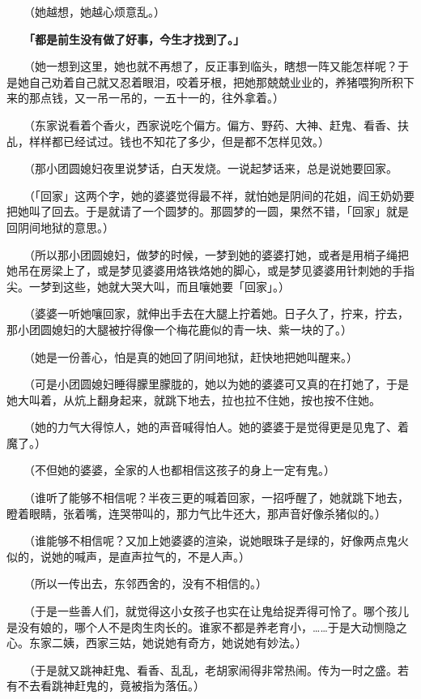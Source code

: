 \documentclass[UTF8]{ctexart}
\begin{document}
　　（她越想，她越心烦意乱。）

　　\textbf{「都是前生没有做了好事，今生才找到了。」}

　　（她一想到这里，她也就不再想了，反正事到临头，瞎想一阵又能怎样呢？于是她自己劝着自己就又忍着眼泪，咬着牙根，把她那兢兢业业的，养猪喂狗所积下来的那点钱，又一吊一吊的，一五十一的，往外拿着。）

　　（东家说看着个香火，西家说吃个偏方。偏方、野药、大神、赶鬼、看香、扶乩，样样都已经试过。钱也不知花了多少，但是都不怎样见效。）

　　（那小团圆媳妇夜里说梦话，白天发烧。一说起梦话来，总是说她要回家。

　　（「回家」这两个字，她的婆婆觉得最不祥，就怕她是阴间的花姐，阎王奶奶要把她叫了回去。于是就请了一个圆梦的。那圆梦的一圆，果然不错，「回家」就是回阴间地狱的意思。）

　　（所以那小团圆媳妇，做梦的时候，一梦到她的婆婆打她，或者是用梢子绳把她吊在房梁上了，或是梦见婆婆用烙铁烙她的脚心，或是梦见婆婆用针刺她的手指尖。一梦到这些，她就大哭大叫，而且嚷她要「回家」。）

　　（婆婆一听她嚷回家，就伸出手去在大腿上拧着她。日子久了，拧来，拧去，那小团圆媳妇的大腿被拧得像一个梅花鹿似的青一块、紫一块的了。）

　　（她是一份善心，怕是真的她回了阴间地狱，赶快地把她叫醒来。）

　　（可是小团圆媳妇睡得朦里朦胧的，她以为她的婆婆可又真的在打她了，于是她大叫着，从炕上翻身起来，就跳下地去，拉也拉不住她，按也按不住她。

　　（她的力气大得惊人，她的声音喊得怕人。她的婆婆于是觉得更是见鬼了、着魔了。）

　　（不但她的婆婆，全家的人也都相信这孩子的身上一定有鬼。）

　　（谁听了能够不相信呢？半夜三更的喊着回家，一招呼醒了，她就跳下地去，瞪着眼睛，张着嘴，连哭带叫的，那力气比牛还大，那声音好像杀猪似的。）

　　（谁能够不相信呢？又加上她婆婆的渲染，说她眼珠子是绿的，好像两点鬼火似的，说她的喊声，是直声拉气的，不是人声。）

　　（所以一传出去，东邻西舍的，没有不相信的。）

　　（于是一些善人们，就觉得这小女孩子也实在让鬼给捉弄得可怜了。哪个孩儿是没有娘的，哪个人不是肉生肉长的。谁家不都是养老育小，……于是大动恻隐之心。东家二姨，西家三姑，她说她有奇方，她说她有妙法。）

　　（于是就又跳神赶鬼、看香、乱乱，老胡家闹得非常热闹。传为一时之盛。若有不去看跳神赶鬼的，竟被指为落伍。）
\end{document}
